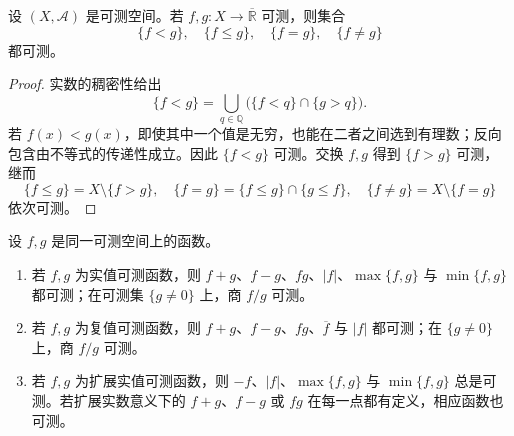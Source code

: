 \begin{proposition}
\label{b1:prop:measurable-comparison-sets}
设 \((X,\mathcal A)\) 是可测空间。若 \(f,g:X\rightarrow\overline{\mathbb R}\) 可测，则集合
\[
\{f<g\},\quad \{f\leq g\},\quad
\{f=g\},\quad \{f\ne g\}
\]
都可测。
\end{proposition}
\begin{proof}
实数的稠密性给出
\[
\{f<g\}
=\bigcup_{q\in\mathbb Q}
\bigl(\{f<q\}\cap\{g>q\}\bigr).
\]
若 \(f(x)<g(x)\)，即使其中一个值是无穷，也能在二者之间选到有理数；反向包含由不等式的传递性成立。因此 \(\{f<g\}\) 可测。交换 \(f,g\) 得到 \(\{f>g\}\) 可测，继而
\[
\{f\leq g\}=X\setminus\{f>g\},
\quad
\{f=g\}=\{f\leq g\}\cap\{g\leq f\},
\quad
\{f\ne g\}=X\setminus\{f=g\}
\]
依次可测。
\end{proof}

\begin{proposition}
\label{b1:prop:measurable-function-algebra}
设 \(f,g\) 是同一可测空间上的函数。
\begin{enumerate}
  \item \label{b1:item:0401-algebra-1}若 \(f,g\) 为实值可测函数，则 \(f+g\)、\(f-g\)、\(fg\)、\(|f|\)、\(\max\{f,g\}\) 与 \(\min\{f,g\}\) 都可测；在可测集 \(\{g\ne0\}\) 上，商 \(f/g\) 可测。
  \item \label{b1:item:0401-algebra-2}若 \(f,g\) 为复值可测函数，则 \(f+g\)、\(f-g\)、\(fg\)、\(\overline f\) 与 \(|f|\) 都可测；在 \(\{g\ne0\}\) 上，商 \(f/g\) 可测。
  \item \label{b1:item:0401-algebra-3}若 \(f,g\) 为扩展实值可测函数，则 \(-f\)、\(|f|\)、\(\max\{f,g\}\) 与 \(\min\{f,g\}\) 总是可测。若扩展实数意义下的 \(f+g\)、\(f-g\) 或 \(fg\) 在每一点都有定义，相应函数也可测。
\end{enumerate}
\end{proposition}
